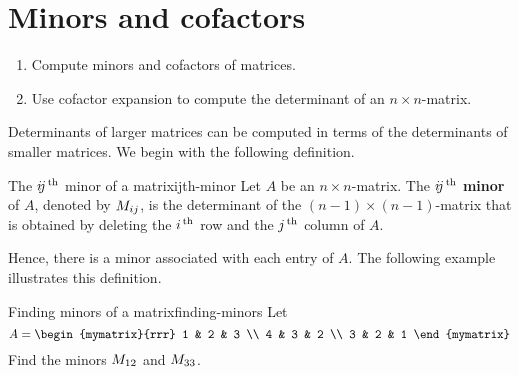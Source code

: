 \section{Minors and cofactors}

\begin{outcome}
  \begin{enumerate}
  \item Compute minors and cofactors of matrices.
  \item Use cofactor expansion to compute the determinant of an
    $n\times n$-matrix.
  \end{enumerate}
\end{outcome}

Determinants of larger matrices can be computed in terms of the
determinants of smaller matrices. We begin with the following
definition.

\begin{definition}{The $\ijth$ minor of a matrix}{ijth-minor}
  Let $A$ be an $n\times n$-matrix. The $\ijth$ \textbf{minor}%
   of $A$, denoted by $\minor{A}{ij}$, is the
  determinant of the $(n-1)\times(n-1)$-matrix that is obtained by
  deleting the $i\th$ row and the $j\th$ column of $A$.
\end{definition}

Hence, there is a minor associated with each entry of $A$. The
following example illustrates this definition.

\begin{example}{Finding minors of a matrix}{finding-minors}
  Let
  \begin{equation*}
    A = \begin{mymatrix}{rrr}
      1 & 2 & 3 \\
      4 & 3 & 2 \\
      3 & 2 & 1
    \end{mymatrix}
  \end{equation*}
  Find the minors $\minor{A}{12}$ and $\minor{A}{33}$.
\end{example}

